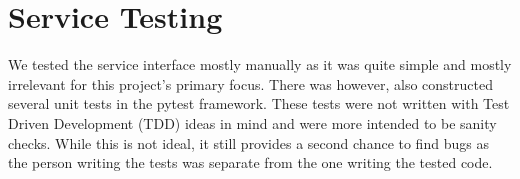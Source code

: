 \section{Service Testing}
We tested the service interface mostly manually as it was quite simple and mostly irrelevant for this project's primary focus. There was however, also constructed several unit tests in the pytest framework. These tests were not written with Test Driven Development (TDD) ideas in mind and were more intended to be sanity checks. While this is not ideal, it still provides a second chance to find bugs as the person writing the tests was separate from the one writing the tested code.